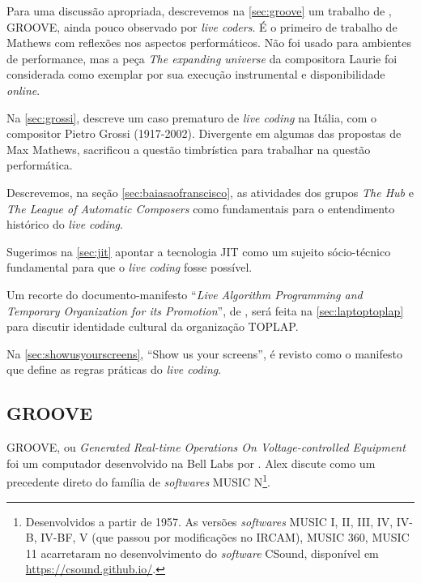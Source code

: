 Para uma discussão apropriada, descrevemos na \autoref{sec:groove} um trabalho de , GROOVE, ainda pouco observado por \emph{live coders}. É o primeiro de trabalho de Mathews com reflexões nos aspectos performáticos. Não foi usado para ambientes de performance, mas a peça \emph{The expanding universe} da compositora Laurie  foi considerada como exemplar por sua execução instrumental e disponibilidade \emph{online}.

Na \autoref{sec:grossi},   descreve um caso prematuro de \emph{live coding} na Itália, com o compositor Pietro Grossi (1917-2002). Divergente em algumas das propostas de Max Mathews, sacrificou a questão timbrística para trabalhar na questão performática.

Descrevemos, na seção \autoref{sec:baiasaofranscisco}, as atividades dos grupos \emph{The Hub} e \emph{The League of Automatic Composers} como fundamentais para o entendimento histórico do \emph{live coding}.

Sugerimos na \autoref{sec:jit} apontar a tecnologia JIT \cite{aycock_brief_2003} como um sujeito sócio-técnico fundamental para que o \emph{live coding} fosse possível.

Um recorte do documento-manifesto ``\emph{Live Algorithm Programming and Temporary Organization for its Promotion}'', de , será feita na \autoref{sec:laptoptoplap} para discutir identidade cultural da organização TOPLAP. 

Na \autoref{sec:showusyourscreens}, ``Show us your screens'', é revisto como o manifesto que define as regras práticas do \emph{live coding}.

\subsection{GROOVE}\label{sec:groove}

GROOVE, ou \emph{Generated Real-time Operations On Voltage-controlled Equipment} foi um computador desenvolvido na Bell Labs por \cite{mathews_groove_1970}. Alex  discute como um precedente direto do família de \emph{softwares} MUSIC N\footnote{Desenvolvidos a partir de 1957. As versões \emph{softwares} MUSIC I, II, III, IV, IV-B, IV-BF, V (que passou por modificações no IRCAM), MUSIC 360, MUSIC 11 acarretaram no desenvolvimento do \emph{software} CSound, disponível em \url{https://csound.github.io/}.}.

